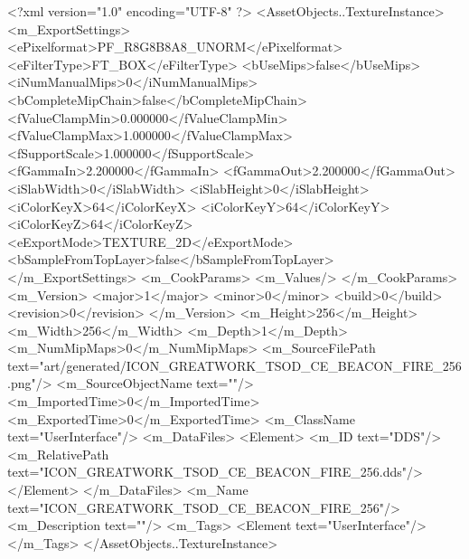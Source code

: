 <?xml version="1.0" encoding="UTF-8" ?>
<AssetObjects..TextureInstance>
	<m_ExportSettings>
		<ePixelformat>PF_R8G8B8A8_UNORM</ePixelformat>
		<eFilterType>FT_BOX</eFilterType>
		<bUseMips>false</bUseMips>
		<iNumManualMips>0</iNumManualMips>
		<bCompleteMipChain>false</bCompleteMipChain>
		<fValueClampMin>0.000000</fValueClampMin>
		<fValueClampMax>1.000000</fValueClampMax>
		<fSupportScale>1.000000</fSupportScale>
		<fGammaIn>2.200000</fGammaIn>
		<fGammaOut>2.200000</fGammaOut>
		<iSlabWidth>0</iSlabWidth>
		<iSlabHeight>0</iSlabHeight>
		<iColorKeyX>64</iColorKeyX>
		<iColorKeyY>64</iColorKeyY>
		<iColorKeyZ>64</iColorKeyZ>
		<eExportMode>TEXTURE_2D</eExportMode>
		<bSampleFromTopLayer>false</bSampleFromTopLayer>
	</m_ExportSettings>
	<m_CookParams>
		<m_Values/>
	</m_CookParams>
	<m_Version>
		<major>1</major>
		<minor>0</minor>
		<build>0</build>
		<revision>0</revision>
	</m_Version>
	<m_Height>256</m_Height>
	<m_Width>256</m_Width>
	<m_Depth>1</m_Depth>
	<m_NumMipMaps>0</m_NumMipMaps>
	<m_SourceFilePath text="art/generated/ICON_GREATWORK_TSOD_CE_BEACON_FIRE_256.png"/>
	<m_SourceObjectName text=""/>
	<m_ImportedTime>0</m_ImportedTime>
	<m_ExportedTime>0</m_ExportedTime>
	<m_ClassName text="UserInterface"/>
	<m_DataFiles>
		<Element>
			<m_ID text="DDS"/>
			<m_RelativePath text="ICON_GREATWORK_TSOD_CE_BEACON_FIRE_256.dds"/>
		</Element>
	</m_DataFiles>
	<m_Name text="ICON_GREATWORK_TSOD_CE_BEACON_FIRE_256"/>
	<m_Description text=""/>
	<m_Tags>
		<Element text="UserInterface"/>
	</m_Tags>
</AssetObjects..TextureInstance>
